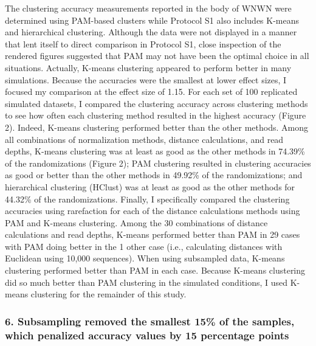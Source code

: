 \documentclass[
]{article}
\begin{document}
The clustering accuracy measurements reported in the body of WNWN were
determined using PAM-based clusters while Protocol S1 also includes
K-means and hierarchical clustering. Although the data were not
displayed in a manner that lent itself to direct comparison in Protocol
S1, close inspection of the rendered figures suggested that PAM may not
have been the optimal choice in all situations. Actually, K-means
clustering appeared to perform better in many simulations. Because the
accuracies were the smallest at lower effect sizes, I focused my
comparison at the effect size of 1.15. For each set of 100 replicated
simulated datasets, I compared the clustering accuracy across clustering
methods to see how often each clustering method resulted in the highest
accuracy (Figure 2). Indeed, K-means clustering performed better than
the other methods. Among all combinations of normalization methods,
distance calculations, and read depths, K-means clustering was at least
as good as the other methods in 74.39\% of the randomizations (Figure
2); PAM clustering resulted in clustering accuracies as good or better
than the other methods in 49.92\% of the randomizations; and
hierarchical clustering (HClust) was at least as good as the other
methods for 44.32\% of the randomizations. Finally, I specifically
compared the clustering accuracies using rarefaction for each of the
distance calculations methods using PAM and K-means clustering. Among
the 30 combinations of distance calculations and read depths, K-means
performed better than PAM in 29 cases with PAM doing better in the 1
other case (i.e., calculating distances with Euclidean using 10,000
sequences). When using subsampled data, K-means clustering performed
better than PAM in each case. Because K-means clustering did so much
better than PAM clustering in the simulated conditions, I used K-means
clustering for the remainder of this study.

\hypertarget{subsampling-removed-the-smallest-15-of-the-samples-which-penalized-accuracy-values-by-15-percentage-points}{%
\subsubsection{6. Subsampling removed the smallest 15\% of the samples,
which penalized accuracy values by 15 percentage
points}\label{subsampling-removed-the-smallest-15-of-the-samples-which-penalized-accuracy-values-by-15-percentage-points}}
\end{document}
